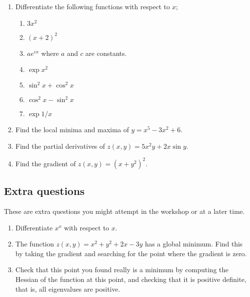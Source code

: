 \documentclass[11pt,a4paper]{scrartcl}
\begin{document}
\begin{enumerate}

\item Differentiate the following functions with respect to $x$;
\begin{enumerate}
\item $3x^2$
\item $(x+2)^2$
\item $ae^{cx}$ where $a$ and $c$ are constants.
\item $\exp{x^2}$
\item $\sin^2{x}+\cos^2{x}$
\item $\cos^2{x}-\sin^2{x}$
\item $\exp{1/x}$
\end{enumerate}

\item Find the local minima and maxima of $y=x^5-3x^2+6$.
 
\item Find the partial derivatives of $z(x,y)=5x^2y+2x\sin{y}$.

\item Find the gradient of $z(x,y)=(x+y^2)^2$.

\end{enumerate}

\subsection*{Extra questions}

These are extra questions you might attempt in the workshop or at a later time.

\begin{enumerate}

\item Differentiate $x^x$ with respect to $x$.
\item The function $z(x, y) = x^2 + y^2 + 2x - 3y$ has a global minimum. Find this by taking
the gradient and searching for the point where the gradient is zero.
\item Check that this point you found really is a minimum by computing the Hessian of the
function at this point, and checking that it is positive definite, that is, all eigenvalues are positive.


\end{enumerate}
\end{document}

